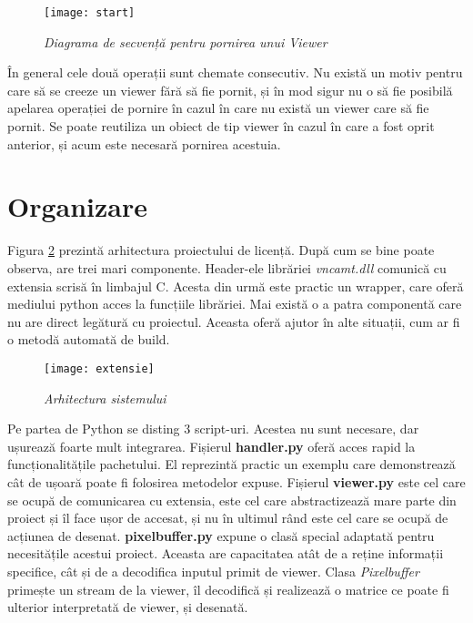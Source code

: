 \begin{figure}
    \centering
    \texttt{[image: start]}
    \caption{\textit{Diagrama de secvență pentru pornirea unui Viewer}}
    \label{seq:start}
\end{figure}

În general cele două operații sunt chemate consecutiv. Nu există un motiv pentru care să se creeze un viewer fără să fie pornit, și în mod sigur nu o să fie posibilă apelarea operației de pornire în cazul în care nu există un viewer care să fie pornit. Se poate reutiliza un obiect de tip viewer în cazul în care a fost oprit anterior, și acum este necesară pornirea acestuia.

%

\section{Organizare}


Figura \ref{exte} prezintă arhitectura proiectului de licență. După cum se bine poate observa, are trei mari componente. Header-ele librăriei \textit{vncamt.dll} comunică cu extensia scrisă în limbajul C. Acesta din urmă este practic un wrapper, care oferă mediului python acces la funcțiile librăriei. Mai există o a patra componentă care nu are direct legătură cu proiectul. Aceasta oferă ajutor în alte situații, cum ar fi o metodă automată de build.

\begin{figure}
    \centering
    \texttt{[image: extensie]}
    \caption{\textit{Arhitectura sistemului}}
    \label{exte}
\end{figure}

Pe partea de Python se disting 3 script-uri. Acestea nu sunt necesare, dar ușurează foarte mult integrarea. Fișierul \textbf{handler.py} oferă acces rapid la funcționalitățile pachetului. El reprezintă practic un exemplu care demonstrează cât de ușoară poate fi folosirea metodelor expuse. Fișierul \textbf{viewer.py} este cel care se ocupă de comunicarea cu extensia, este cel care abstractizează mare parte din proiect și îl face ușor de accesat, și nu în ultimul rând este cel care se ocupă de acțiunea de desenat. \textbf{pixelbuffer.py} expune o clasă special adaptată pentru necesitățile acestui proiect. Aceasta are capacitatea atât de a reține informații specifice, cât și de a decodifica inputul primit de viewer. Clasa \textit{Pixelbuffer} primește un stream de la viewer, îl decodifică și realizează o matrice ce poate fi ulterior interpretată de viewer, și desenată.

